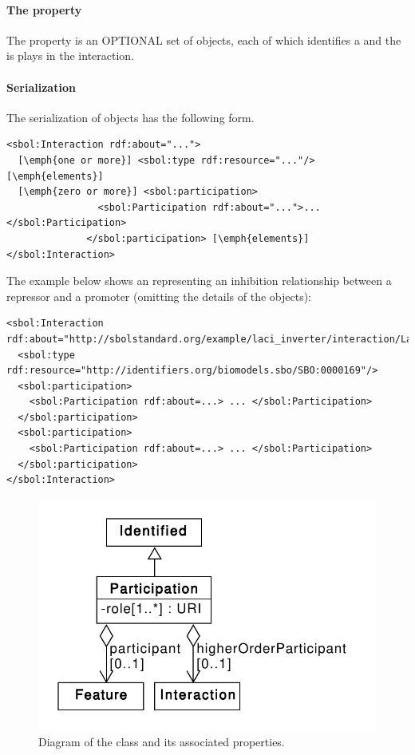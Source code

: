 \paragraph{The  property}\label{sec:participations}

The  property is an OPTIONAL set of  objects, each of which identifies a  and the  is plays in the interaction.


\paragraph{Serialization}

The serialization of  objects has the following form.
\begin{lstlisting}
<sbol:Interaction rdf:about="...">
  [\emph{one or more}] <sbol:type rdf:resource="..."/> [\emph{elements}]
  [\emph{zero or more}] <sbol:participation>
                <sbol:Participation rdf:about="...">...</sbol:Participation>
              </sbol:participation> [\emph{elements}]
</sbol:Interaction>
\end{lstlisting}

The example below shows an  representing an inhibition relationship between a repressor and a promoter (omitting the details of the  objects):

\begin{lstlisting}
<sbol:Interaction rdf:about="http://sbolstandard.org/example/laci_inverter/interaction/LacI_pLacI">
  <sbol:type rdf:resource="http://identifiers.org/biomodels.sbo/SBO:0000169"/>
  <sbol:participation>
    <sbol:Participation rdf:about=...> ... </sbol:Participation>
  </sbol:participation>
  <sbol:participation>
    <sbol:Participation rdf:about=...> ... </sbol:Participation>
  </sbol:participation>
</sbol:Interaction>
\end{lstlisting}


\begin{figure}[ht]
\begin{center}
\includegraphics[scale=0.6]{uml/participation}
\caption[]{Diagram of the  class and its associated properties.}
\label{uml:participation}
\end{center}
\end{figure}

